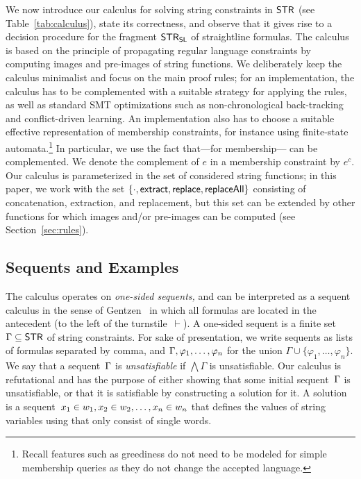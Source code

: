 We now introduce our calculus for solving string constraints in
$\mathsf{STR}$ (see Table~\ref{tab:calculus}), state its correctness, and observe that it gives rise to a
decision procedure for the fragment $\mathsf{STR}_{\mathsf{SL}}$ of straightline
formulas. The calculus is based on the principle of propagating
regular language constraints by computing images and pre-images of
string functions. We deliberately keep the calculus minimalist and
focus on the main proof rules; for an implementation, the calculus has
to be complemented with a suitable strategy for applying the rules, as
well as standard SMT optimizations such as non-chronological
back-tracking and conflict-driven learning. An implementation also has
to choose a suitable effective representation of \regexp{}
membership constraints, for instance using finite-state automata.\footnote{
    Recall features such as greediness do not need to be modeled for simple membership queries as they do not change the accepted language.
}
In particular, we use the fact that---for membership---\regexp{} can be complemented.
We denote the complement of $e$ in a membership constraint by $e^c$.
%
Our calculus is parameterized in the set of considered string
functions; in this paper, we work with the set
$\{\cdot, \mathsf{extract}, \mathsf{replace}, \mathsf{replaceAll}\}$ consisting of
concatenation, extraction, and replacement, but this set can be
extended by other functions for which images and/or pre-images can be
computed (see Section~\ref{sec:rules}).

\subsection{Sequents and Examples}

The calculus operates on \emph{one-sided sequents,} and can be
interpreted as a sequent calculus in the sense of
Gentzen~\cite{Gentzen35} in which all formulas are located in the
antecedent (to the left of the turnstile~$\vdash$). A one-sided sequent is a
finite set $\Gamma \subseteq \mathsf{STR}$ of string constraints. For sake
of presentation, we write sequents as lists of formulas separated by
comma, and $\seqq{\varphi_1, \ldots, \varphi_n}$ for the union
$\Gamma \cup \{\varphi_1, \ldots, \varphi_n\}$. We say that a
sequent~$\seqq{}$ is \emph{unsatisfiable} if $\bigwedge \Gamma$ is
unsatisfiable. Our calculus is refutational and has the purpose of
either showing that some initial sequent~$\seqq{}$ is unsatisfiable,
or that it is satisfiable by constructing a solution for it. A
solution is a
sequent~$x_1 \in w_1, x_2 \in w_2, \ldots, x_n \in w_n$ that
defines the values of string variables using \regexps{} that only consist
of single words.

